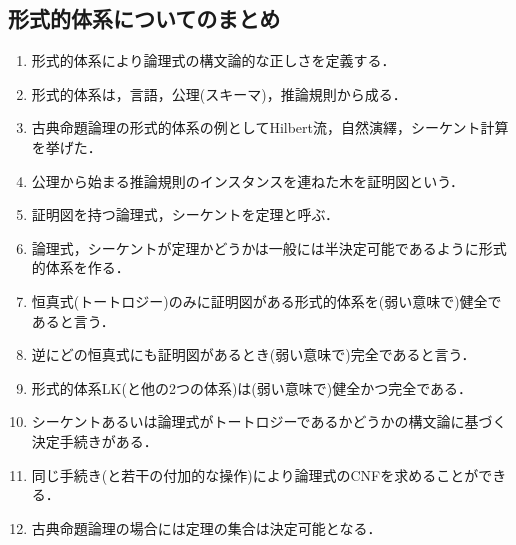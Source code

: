 \documentclass{ltjsarticle}
\theoremstyle{mystyle1}
\theoremstyle{mystyle3}
\theoremstyle{mystyle2}
\begin{document}
\subsection{形式的体系についてのまとめ}
\begin{enumerate}
  \item 形式的体系により論理式の構文論的な正しさを定義する．
  \item 形式的体系は，言語，公理(スキーマ)，推論規則から成る．
  \item 古典命題論理の形式的体系の例としてHilbert流，自然演繹，シーケント計算を挙げた．
  \item 公理から始まる推論規則のインスタンスを連ねた木を証明図という．
  \item 証明図を持つ論理式，シーケントを定理と呼ぶ．
  \item 論理式，シーケントが定理かどうかは一般には半決定可能であるように形式的体系を作る．
  \item 恒真式(トートロジー)のみに証明図がある形式的体系を(弱い意味で)健全であると言う．
  \item 逆にどの恒真式にも証明図があるとき(弱い意味で)完全であると言う．
  \item 形式的体系LK(と他の2つの体系)は(弱い意味で)健全かつ完全である．
  \item シーケントあるいは論理式がトートロジーであるかどうかの構文論に基づく決定手続きがある．
  \item 同じ手続き(と若干の付加的な操作)により論理式のCNFを求めることができる．
  \item 古典命題論理の場合には定理の集合は決定可能となる．
\end{enumerate}
\end{document}
